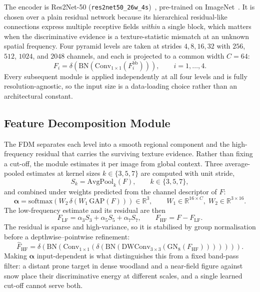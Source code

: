 \documentclass[3p,times,procedia]{elsarticle}
\begin{document}
The encoder is Res2Net-50 (\texttt{res2net50\_26w\_4s})~\cite{res2net}, pre-trained on ImageNet~\cite{imagenet}. It is chosen over a plain residual network because its hierarchical residual-like connections express multiple receptive fields \emph{within} a single block, which matters when the discriminative evidence is a texture-statistic mismatch at an unknown spatial frequency. Four pyramid levels are taken at strides $4, 8, 16, 32$ with $256$, $512$, $1024$, and $2048$ channels, and each is projected to a common width $C=64$:
\begin{equation}
F_i = \delta\!\left(\mathrm{BN}\!\left(\mathrm{Conv}_{1\times1}(F_i^{\mathrm{bb}})\right)\right), \qquad i = 1,\ldots,4 .
\end{equation}
Every subsequent module is applied independently at all four levels and is fully resolution-agnostic, so the input size is a data-loading choice rather than an architectural constant.

\subsection{Feature Decomposition Module}

The FDM separates each level into a smooth regional component and the high-frequency residual that carries the surviving texture evidence. Rather than fixing a cut-off, the module estimates it per image from global context. Three average-pooled estimates at kernel sizes $k \in \{3,5,7\}$ are computed with unit stride,
\begin{equation}
S_k = \mathrm{AvgPool}_{k}(F), \qquad k \in \{3,5,7\},
\end{equation}
and combined under weights predicted from the channel descriptor of $F$:
\begin{equation}
\boldsymbol{\alpha} = \mathrm{softmax}\!\left(W_2\,\delta\!\left(W_1\,\mathrm{GAP}(F)\right)\right) \in \mathbb{R}^{3},
\qquad
W_1 \in \mathbb{R}^{16 \times C},\; W_2 \in \mathbb{R}^{3 \times 16}.
\end{equation}
The low-frequency estimate and its residual are then
\begin{equation}
F_{\mathrm{LF}} = \alpha_3 S_3 + \alpha_5 S_5 + \alpha_7 S_7,
\qquad
F_{\mathrm{HF}} = F - F_{\mathrm{LF}} .
\end{equation}
The residual is sparse and high-variance, so it is stabilised by group normalisation before a depthwise--pointwise refinement:
\begin{equation}
\hat{F}_{\mathrm{HF}} = \delta\!\left(\mathrm{BN}\!\left(\mathrm{Conv}_{1\times1}
\left(\delta\!\left(\mathrm{BN}\!\left(\mathrm{DWConv}_{3\times3}
\left(\mathrm{GN}_{8}(F_{\mathrm{HF}})\right)\right)\right)\right)\right)\right).
\end{equation}
Making $\boldsymbol{\alpha}$ input-dependent is what distinguishes this from a fixed band-pass filter: a distant prone target in dense woodland and a near-field figure against snow place their discriminative energy at different scales, and a single learned cut-off cannot serve both.
\end{document}
